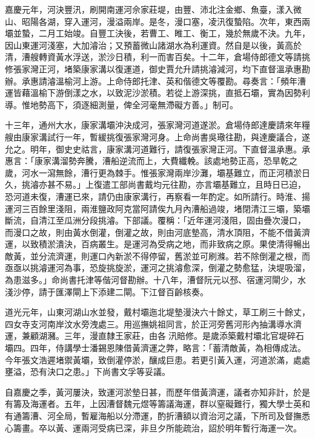 \begin{pinyinscope}
嘉慶元年，河決豐汛，刷開南運河佘家莊堤，由豐、沛北注金鄉、魚臺，漾入微山、昭陽各湖，穿入運河，漫溢兩岸。是冬，漫口塞，凌汛復蟄陷。次年，東西兩壩並蟄，二月工始竣。自豐工決後，若曹工、睢工、衡工，幾於無歲不決。九年，因山東運河淺塞，大加濬治；又預蓄微山諸湖水為利運資。然自是以後，黃高於清，漕艘轉資黃水浮送，淤沙日積，利一而害百矣。十二年，倉場侍郎德文等請挑修張家灣正河，堵築康家溝以復運道，御史賈允升請挑濬減河，均下直督溫承惠勘辦。承惠請濬溫榆河上游。上命侍郎托津、英和偕德文等覆勘。尋奏言：「頻年漕運皆藉溫榆下游倒漾之水，以致泥沙淤積。若從上游深挑，直抵石壩，實為因勢利導。惟地勢高下，須逐細測量，俾全河毫無滯礙方善。」制可。

十三年，通州大水，康家溝壩沖決成河，張家灣河道遂淤。倉場侍郎達慶請來年糧艘由康家溝試行一年，暫緩挑復張家灣河身。上命尚書吳璥往勘，與達慶議合，遂允之。明年，御史史祜言，康家溝河道難行，請復張家灣正河。下直督溫承惠。承惠言：「康家溝溜勢奔騰，漕船逆流而上，大費纖輓。該處地勢正高，恐旱乾之歲，河水一瀉無餘，漕行更為棘手。惟張家灣兩岸沙灘，壩基難立，而正河積淤日久，挑濬亦甚不易。」上復遣工部尚書戴均元往勘，亦言壩基難立，且時日已迫，恐河道未復，漕運已來，請仍由康家溝行，再察看一年酌定。如所請行。時淮、揚運河三百餘里淺阻，兩淮鹽政阿克當阿請俟九月內漕船過竣，堵閉清江三壩，築壩斷流，自清江至瓜洲分段挑濬。下部議。覆稱：「近年運河淺阻，固由疊次漫口，而漫口之故，則由黃水倒灌，倒灌之故，則由河底墊高，清水頂阻，不能不借黃濟運，以致積淤潰決，百病叢生。是運河為受病之地，而非致病之原。果使清得暢出敵黃，並分流濟運，則運口內新淤不得停留，舊淤並可刷滌。若不除倒灌之根，而亟亟以挑濬運河為事，恐旋挑旋淤，運河之挑濬愈深，倒灌之勢愈猛，決堤吸溜，為患滋多。」命尚書托津等偕河督勘辦。十八年，漕督阮元以邳、宿運河閘少，水淺沙停，請于匯澤閘上下添建二閘。下江督百齡核奏。

道光元年，山東河湖山水並發，戴村壩迤北堤墊漫決六十餘丈，草工刷三十餘丈，四女寺支河南岸汶水旁洩處三。用巡撫姚祖同言，於正河旁舊河形內抽溝導水濟運，兼顧湖瀦。三年，漫直隸王家莊，由各汛賠修。是歲添築戴村壩北官堤碎石壩四。四年，侍講學士潘錫恩陳借黃濟運之弊，略言：「蓄清敵黃，為相傳成法。今年張文浩遲堵禦黃壩，致倒灌停淤，釀成巨患。若更引黃入運，河道淤滿，處處壅溢，恐有決口之患。」下尚書文孚等妥議。

自嘉慶之季，黃河屢決，致運河淤墊日甚，而歷年借黃濟運，議者亦知非計，於是有籌及海運者。五年，上因漕督魏元煜等籌議海運，群以窒礙難行，獨大學士英和有通籌漕、河全局，暫雇海船以分滯運，酌折漕額以資治河之議，下所司及督撫悉心籌畫。卒以黃、運兩河受病已深，非旦夕所能疏治，詔於明年暫行海運一次。


\end{pinyinscope}
